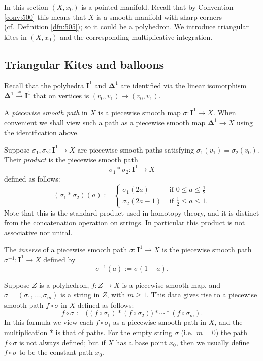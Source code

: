 \documentclass[10pt, a4paper]{amsart}
\theoremstyle{definition}
\numberwithin{equation}{section}
\newcommand{\iso}{\xrightarrow{\simeq}}
\newcommand{\mbf}[1]{\mathbf{#1}}
\newcommand{\smfrac}[2]{{\textstyle \frac{#1}{#2}}}
\newcommand{\bsym}[1]{\boldsymbol{#1}}
\begin{document}
In this section $(X, x_0)$ is a pointed manifold. 
Recall that by Convention \ref{conv:500} this means that $X$ is a smooth
manifold with sharp
corners (cf.\ Definition \ref{dfn:505}); so it could be a polyhedron.
We introduce triangular kites in $(X, x_0)$ and the corresponding multiplicative
integration. 

\subsection{Triangular Kites and balloons}
Recall that the polyhedra $\mbf{I}^1$ and $\bsym{\Delta}^1$ are identified via
the linear isomorphism $\bsym{\Delta}^1 \iso \mbf{I}^1$ that on vertices is
$(v_0, v_1) \mapsto (v_0, v_1)$. 

A {\em piecewise smooth path} in $X$ is a 
piecewise smooth map $\sigma: \mbf{I}^1 \to X$. 
When convenient we shall view such a path as a piecewise smooth map 
$\bsym{\Delta}^1 \to X$ using the identification above.

Suppose $\sigma_1, \sigma_2 : \mbf{I}^1 \to X$ are piecewise smooth paths
satisfying $\sigma_1(v_1) = \sigma_2(v_0)$. 
Their {\em product} is the piecewise smooth path
\[ \sigma_1 * \sigma_2 : \mbf{I}^1 \to X \]
defined as follows:
\[ (\sigma_1 * \sigma_2)(a) := 
\begin{cases}
\sigma_1(2 a) & \text{ if } 0 \leq a \leq \smfrac{1}{2} \\
\sigma_2(2 a - 1) & \text{ if } \smfrac{1}{2} \leq a \leq 1 .
\end{cases} \]
Note that this is the standard product used in homotopy theory, and it is
distinct from the concatenation operation on strings. In particular this product
is not associative nor unital.

The {\em inverse} of a piecewise smooth path
$\sigma : \mbf{I}^1 \to X$ is the piecewise smooth path
$\sigma^{-1} : \mbf{I}^1 \to X$ defined by
\[ \sigma^{-1}(a) := \sigma(1 - a) . \]

Suppose $Z$ is a polyhedron, $f : Z \to X$ is a piecewise smooth map, and 
$\sigma = (\sigma_1, \ldots, \sigma_m)$ is a
string in $Z$, with $m \geq 1$. This data gives rise to a piecewise smooth path
$f \circ \sigma$ in $X$ defined as follows:
\begin{equation} \label{eqn:227}
f \circ \sigma := \bigl( (f \circ \sigma_1) * (f \circ \sigma_2) \bigr)
* \cdots * (f \circ \sigma_m) .
\end{equation}
In this formula we view each $f \circ \sigma_i$ as a piecewise smooth path in
$X$, and the multiplication $*$ is that of paths. 
For the empty string $\sigma$ (i.e.\ $m = 0$) the path 
$f \circ \sigma$ is not always defined; but if $X$ has a base point $x_0$, then
we usually define $f \circ \sigma$ to be the constant path $x_0$.
\end{document}
